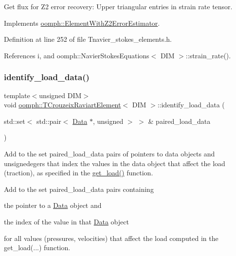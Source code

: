 Get \textquotesingle{}flux\textquotesingle{} for Z2 error recovery\+: Upper triangular entries in strain rate tensor. 



Implements \hyperlink{classoomph_1_1ElementWithZ2ErrorEstimator_a5688ff5f546d81771cabad82ca5a7556}{oomph\+::\+Element\+With\+Z2\+Error\+Estimator}.



Definition at line 252 of file Tnavier\+\_\+stokes\+\_\+elements.\+h.



References i, and oomph\+::\+Navier\+Stokes\+Equations$<$ D\+I\+M $>$\+::strain\+\_\+rate().

\mbox{\label{classoomph_1_1TCrouzeixRaviartElement_a009e154cb1934dce92933a36280333a6}} 
\subsubsection{\texorpdfstring{identify\+\_\+load\+\_\+data()}{identify\_load\_data()}}
{\footnotesize\ttfamily template$<$unsigned D\+IM$>$ \\
void \hyperlink{classoomph_1_1TCrouzeixRaviartElement}{oomph\+::\+T\+Crouzeix\+Raviart\+Element}$<$ D\+IM $>$\+::identify\+\_\+load\+\_\+data (\begin{DoxyParamCaption}\item[{std\+::set$<$ std\+::pair$<$ \hyperlink{classoomph_1_1Data}{Data} $\ast$, unsigned $>$ $>$ \&}]{paired\+\_\+load\+\_\+data }\end{DoxyParamCaption})\hspace{0.3cm}{\ttfamily [virtual]}}



Add to the set paired\+\_\+load\+\_\+data pairs of pointers to data objects and unsignedegers that index the values in the data object that affect the load (traction), as specified in the \hyperlink{classoomph_1_1NavierStokesEquations_af2e10e52fc3a54b580e330fd763aa9f5}{get\+\_\+load()} function. 

Add to the set {\ttfamily paired\+\_\+load\+\_\+data} pairs containing
\begin{DoxyItemize}
\item the pointer to a \hyperlink{classoomph_1_1Data}{Data} object and
\item the index of the value in that \hyperlink{classoomph_1_1Data}{Data} object
\end{DoxyItemize}for all values (pressures, velocities) that affect the load computed in the {\ttfamily get\+\_\+load}(...) function. 

